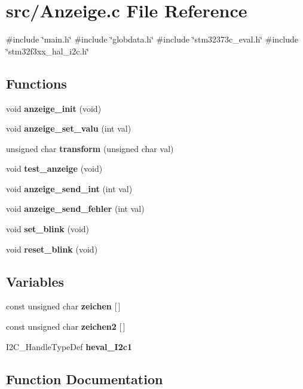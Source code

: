 \section{src/\+Anzeige.c File Reference}
\label{_anzeige_8c}
{\ttfamily \#include \char`\"{}main.\+h\char`\"{}}\newline
{\ttfamily \#include \char`\"{}globdata.\+h\char`\"{}}\newline
{\ttfamily \#include \char`\"{}stm32373c\+\_\+eval.\+h\char`\"{}}\newline
{\ttfamily \#include \char`\"{}stm32f3xx\+\_\+hal\+\_\+i2c.\+h\char`\"{}}\newline
\subsection*{Functions}
\begin{DoxyCompactItemize}
\item 
void \textbf{ anzeige\+\_\+init} (void)
\item 
void \textbf{ anzeige\+\_\+set\+\_\+valu} (int val)
\item 
unsigned char \textbf{ transform} (unsigned char val)
\item 
void \textbf{ test\+\_\+anzeige} (void)
\item 
void \textbf{ anzeige\+\_\+send\+\_\+int} (int val)
\item 
void \textbf{ anzeige\+\_\+send\+\_\+fehler} (int val)
\item 
void \textbf{ set\+\_\+blink} (void)
\item 
void \textbf{ reset\+\_\+blink} (void)
\end{DoxyCompactItemize}
\subsection*{Variables}
\begin{DoxyCompactItemize}
\item 
const unsigned char \textbf{ zeichen} [$\,$]
\item 
const unsigned char \textbf{ zeichen2} [$\,$]
\item 
I2\+C\+\_\+\+Handle\+Type\+Def \textbf{ heval\+\_\+\+I2c1}
\end{DoxyCompactItemize}


\subsection{Function Documentation}
\mbox{\label{_anzeige_8c_a3edabdf3950710d9364bc988d3002d36}} 
